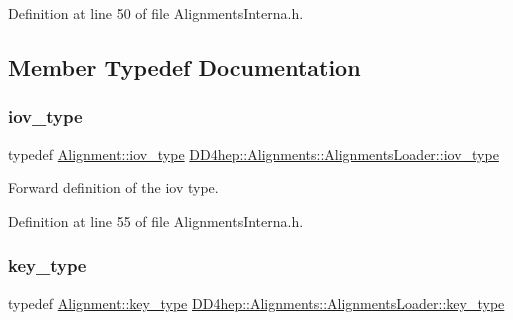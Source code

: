 Definition at line 50 of file Alignments\+Interna.\+h.



\subsection{Member Typedef Documentation}
\hypertarget{class_d_d4hep_1_1_alignments_1_1_alignments_loader_a632271e6cb9198528a0826d9082561d1}{}\label{class_d_d4hep_1_1_alignments_1_1_alignments_loader_a632271e6cb9198528a0826d9082561d1} 
\subsubsection{\texorpdfstring{iov\+\_\+type}{iov\_type}}
{\footnotesize\ttfamily typedef \hyperlink{class_d_d4hep_1_1_alignments_1_1_alignment_afd988c803da5a514d8fa255784f29462}{Alignment\+::iov\+\_\+type} \hyperlink{class_d_d4hep_1_1_alignments_1_1_alignments_loader_a632271e6cb9198528a0826d9082561d1}{D\+D4hep\+::\+Alignments\+::\+Alignments\+Loader\+::iov\+\_\+type}\hspace{0.3cm}{\ttfamily [protected]}}



Forward definition of the iov type. 



Definition at line 55 of file Alignments\+Interna.\+h.

\hypertarget{class_d_d4hep_1_1_alignments_1_1_alignments_loader_af56e6294e72dacbe001c1f24b8381d5d}{}\label{class_d_d4hep_1_1_alignments_1_1_alignments_loader_af56e6294e72dacbe001c1f24b8381d5d} 
\subsubsection{\texorpdfstring{key\+\_\+type}{key\_type}}
{\footnotesize\ttfamily typedef \hyperlink{class_d_d4hep_1_1_alignments_1_1_alignment_ab824a65f935a0c79b9ea1a7a85014b88}{Alignment\+::key\+\_\+type} \hyperlink{class_d_d4hep_1_1_alignments_1_1_alignments_loader_af56e6294e72dacbe001c1f24b8381d5d}{D\+D4hep\+::\+Alignments\+::\+Alignments\+Loader\+::key\+\_\+type}\hspace{0.3cm}{\ttfamily [protected]}}



